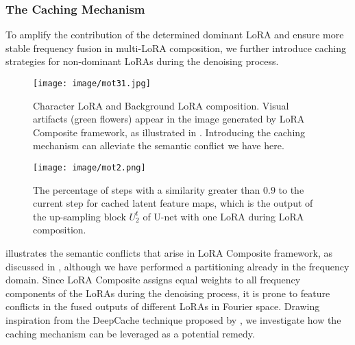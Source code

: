 \subsubsection{The Caching Mechanism}
\label{sec:cache}
To amplify the contribution of the determined dominant LoRA and ensure more stable frequency fusion in multi-LoRA composition, we further introduce caching strategies for non-dominant LoRAs during the denoising process. 
\vspace{-6pt}
\begin{figure}[H]
    \centering
    \setlength{\abovecaptionskip}{6pt}
    \setlength{\belowcaptionskip}{-16pt}
    \begin{minipage}[b]{0.45\textwidth}
        \centering
        \texttt{[image: image/mot31.jpg]}
        \caption{Character LoRA and Background LoRA composition. Visual artifacts (green flowers) appear in the image generated by LoRA Composite framework, as illustrated in . Introducing the caching mechanism can alleviate the semantic conflict we have here.}
        \label{fig:motivation2}
    \end{minipage}\hfill
    \begin{minipage}[b]{0.53\textwidth}
        \centering
        \texttt{[image: image/mot2.png]}
        \caption{The percentage of steps with a similarity greater than $0.9$ to the current step for cached latent feature maps, which is the output of the up-sampling block $U^{t}_{2}$ of U-net with one LoRA during LoRA composition.}
        \label{mot2}
    \end{minipage}
\end{figure}

 illustrates the semantic conflicts that arise in LoRA Composite framework, as discussed in , although we have performed a partitioning already in the frequency domain. Since LoRA Composite assigns equal weights to all frequency components of the LoRAs during the denoising process, it is prone to feature conflicts in the fused outputs of different LoRAs in Fourier space. Drawing inspiration from the DeepCache technique proposed by \citet{deepcache}, we investigate how the caching mechanism can be leveraged as a potential remedy.



